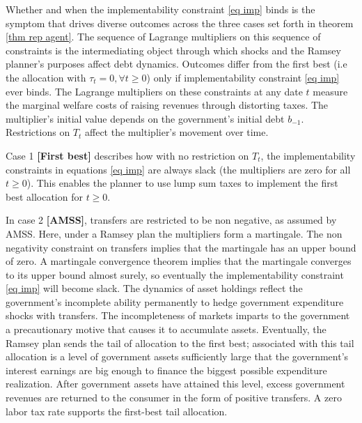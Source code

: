 \documentclass[thmsb,11pt]{article}
\begin{document}
Whether  and when the implementability constraint \eqref{eq imp}  binds  is the symptom  that drives  diverse outcomes across  the three cases
 set forth in theorem  \ref{thm rep agent}.  The sequence of Lagrange multipliers on this sequence of  constraints is the intermediating object through which
shocks and the Ramsey planner's purposes  affect  debt dynamics.  Outcomes  differ from the first best (i.e the allocation with $\tau_t=0, \forall t\geq0$) only if  implementability constraint  \eqref{eq imp} ever binds. The Lagrange multipliers on these constraints at any date $t$ measure
    the marginal welfare costs of raising revenues through distorting taxes.  The multiplier's initial value depends on the government's initial debt
     $b_{-1}$.  Restrictions on  $T_t$ affect the  multiplier's  movement over time. 

Case 1 \textbf{[First best]} describes how with no restriction on $T_t$, the implementability  constraints in equations \eqref{eq imp} are  always slack (the multipliers are zero for all $t\geq 0$). This enables  the  planner  to use lump sum taxes
 to implement the first best allocation for $t \geq 0$.

In case 2 \textbf{[AMSS]},  transfers are restricted  to be non negative, as assumed by AMSS. Here, under a Ramsey plan the multipliers
 form a  martingale. The non negativity constraint on transfers implies that the martingale has an upper bound of zero.
  A martingale convergence theorem implies  that the martingale converges to its upper bound almost surely, so   eventually the  implementability constraint \eqref{eq imp} will become  slack. The dynamics of asset holdings reflect  the government's
   incomplete ability permanently to hedge government expenditure shocks with transfers. The incompleteness of markets imparts to the government  a precautionary motive that causes it to  accumulate assets. Eventually, the Ramsey plan sends the tail of allocation to  the first best; associated with this tail allocation
    is a level of government assets sufficiently large that  the government's interest earnings are big enough to finance the biggest possible expenditure realization. After government assets have attained this level, excess government revenues  are returned to the consumer in the form of  positive transfers. A zero labor tax rate supports the first-best tail allocation.
\end{document}

